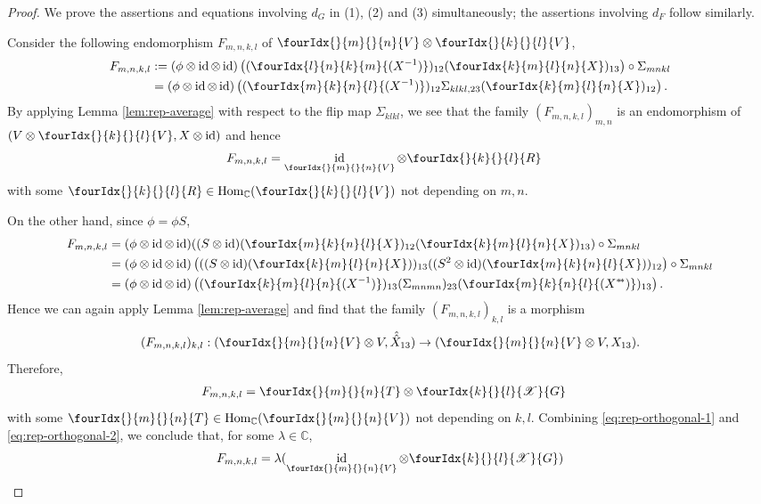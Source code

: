 \documentclass[10pt]{article}
\DeclareMathOperator{\id}{id}
\DeclareMathOperator{\Hom}{Hom}
\newcommand{\dual}[1]{#1^{*}}
\newcommand{\C}{\mathbb{C}}
\newcommand{\Gr}[5]{\fourIdx{#2}{#4}{#3}{#5}{#1}}%
\newcommand{\Gru}[3]{\Gr{#1}{}{}{#2}{#3}}
\theoremstyle{definition}
\numberwithin{equation}{section}
\begin{document}
\begin{proof}
  We prove the assertions and equations involving $d_G$ in (1), (2)
  and (3)  simultaneously; the assertions involving $d_F$  follow similarly.

  Consider
  the following endomorphism $F_{m,n,k,l}$ of $\Gru{V}{m}{n}\otimes \Gru{V}{k}{l}$, 
  \begin{align*}
    F_{m,n,k,l}
    &:=(\phi \otimes \id \otimes \id)\left((\Gr{(X^{-1})}{l}{k}{n}{m})_{12}(\Gr{X}{k}{l}{m}{n})_{13}\right)
    \circ \Sigma_{mnkl} \\ &= (\phi \otimes \id \otimes
    \id)\left((\Gr{(X^{-1})}{m}{n}{k}{l})_{12}
      \Sigma_{klkl,23}(\Gr{X}{k}{l}{m}{n})_{12}\right).
  \end{align*}
  By applying Lemma \ref{lem:rep-average} with respect to the flip map $\Sigma_{klkl}$, we see that the family $(F_{m,n,k,l})_{m,n}$ is
  an endomorphism of $(V \otimes \Gru{V}{k}{l}, X\otimes \id)$ and hence
  \begin{align}
    F_{m,n,k,l} &= \id_{\Gru{V}{m}{n}} \otimes \Gru{R}{k}{l} \label{eq:rep-orthogonal-1}
  \end{align}
  with some $\Gru{R}{k}{l} \in \Hom_{\C}(\Gru{V}{k}{l})$ not
  depending on $m,n$. 
  
  On the other hand, since $\phi = \phi S$,
  \begin{align*}
    F_{m,n,k,l} &= (\phi \otimes \id \otimes \id)((S \otimes
    \id)(\Gr{X}{m}{n}{k}{l})_{12}(\Gr{X}{k}{l}{m}{n})_{13})
    \circ \Sigma_{mnkl} \\
    &= (\phi \otimes \id \otimes \id)\left(((S \otimes
      \id)(\Gr{X}{k}{l}{m}{n}))_{13}
      ((S^{2} \otimes \id)(\Gr{X}{m}{n}{k}{l}))_{12}\right)     \circ \Sigma_{mnkl}\\
    &= (\phi \otimes \id \otimes
    \id)\left((\Gr{(X^{-1})}{k}{l}{m}{n})_{13} (\Sigma_{mnmn})_{23}
      (\Gr{(\dual{\dual{X}{}\!})}{m}{n}{k}{l})_{13}\right).
  \end{align*}
  Hence we can again apply Lemma \ref{lem:rep-average} and
  find that the family $(F_{m,n,k,l})_{k,l}$ is a morphism \[(F_{m,n,k,l})_{k,l}:
  (\Gru{V}{m}{n} \otimes V, \hat{\hat{X}}_{13})\rightarrow (\Gru{V}{m}{n} \otimes V,
 X_{13}).\] Therefore,
  \begin{align}
    F_{m,n,k,l} &= \Gru{T}{m}{n} \otimes \Gr{G}{k}{l}{}{\mathscr{X}} \label{eq:rep-orthogonal-2}
  \end{align}
  with some $\Gru{T}{m}{n} \in \mathcal{\Hom_{\C}}(\Gru{V}{m}{n})$
  not depending on $k,l$. Combining \eqref{eq:rep-orthogonal-1} and
  \eqref{eq:rep-orthogonal-2}, we conclude that, for some $\lambda\in \C$, \[F_{m,n,k,l} = \lambda
  (\id_{\Gru{V}{m}{n}} \otimes \Gr{G}{k}{l}{}{\mathscr{X}})\]
  

\end{proof}
\end{document}
